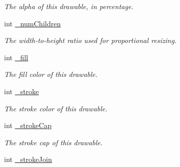 \begin{DoxyCompactItemize}
\begin{DoxyCompactList}\small\item\em The alpha of this drawable, in percentage. \end{DoxyCompactList}\item 
int \hyperlink{classhype_1_1core_1_1drawable_1_1_h_drawable_a3d2ec798d880968b25a5c81a8dd31357}{\-\_\-num\-Children}
\begin{DoxyCompactList}\small\item\em The width-\/to-\/height ratio used for proportional resizing. \end{DoxyCompactList}\item 
\hypertarget{classhype_1_1core_1_1drawable_1_1_h_drawable_a5f07bd6382bd895ca51c51a2285a31dc}{int \hyperlink{classhype_1_1core_1_1drawable_1_1_h_drawable_a5f07bd6382bd895ca51c51a2285a31dc}{\-\_\-fill}}\label{classhype_1_1core_1_1drawable_1_1_h_drawable_a5f07bd6382bd895ca51c51a2285a31dc}

\begin{DoxyCompactList}\small\item\em The fill color of this drawable. \end{DoxyCompactList}\item 
\hypertarget{classhype_1_1core_1_1drawable_1_1_h_drawable_aa773c8e474774a4f4b6437f77abdc85b}{int \hyperlink{classhype_1_1core_1_1drawable_1_1_h_drawable_aa773c8e474774a4f4b6437f77abdc85b}{\-\_\-stroke}}\label{classhype_1_1core_1_1drawable_1_1_h_drawable_aa773c8e474774a4f4b6437f77abdc85b}

\begin{DoxyCompactList}\small\item\em The stroke color of this drawable. \end{DoxyCompactList}\item 
\hypertarget{classhype_1_1core_1_1drawable_1_1_h_drawable_a35be29f7a889fada5549c5dfcaa98d7d}{int \hyperlink{classhype_1_1core_1_1drawable_1_1_h_drawable_a35be29f7a889fada5549c5dfcaa98d7d}{\-\_\-stroke\-Cap}}\label{classhype_1_1core_1_1drawable_1_1_h_drawable_a35be29f7a889fada5549c5dfcaa98d7d}

\begin{DoxyCompactList}\small\item\em The stroke cap of this drawable. \end{DoxyCompactList}\item 
\hypertarget{classhype_1_1core_1_1drawable_1_1_h_drawable_a3b021f60cc0552c6d1c5d4e298419dec}{int \hyperlink{classhype_1_1core_1_1drawable_1_1_h_drawable_a3b021f60cc0552c6d1c5d4e298419dec}{\-\_\-stroke\-Join}}\label{classhype_1_1core_1_1drawable_1_1_h_drawable_a3b021f60cc0552c6d1c5d4e298419dec}


\end{DoxyCompactItemize}
